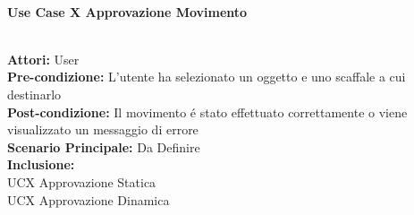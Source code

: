 \vspace{0.5cm}

\Large\textbf{}\\
\Large\textbf{Use Case X Approvazione Movimento} \\

\vspace{0.5cm}

\large\textbf{} \\
\textbf{Attori:} User\\
\textbf{Pre-condizione:} L'utente ha selezionato un oggetto e uno scaffale a cui destinarlo \\
\textbf{Post-condizione: } Il movimento é stato effettuato correttamente o viene visualizzato un messaggio di errore\\
\textbf{Scenario Principale:} Da Definire \\
\textbf{Inclusione:} \\
UCX Approvazione Statica \\
UCX Approvazione Dinamica \\

\vspace{0.5cm}

\textbf{}\\
{} \\
{}\\

